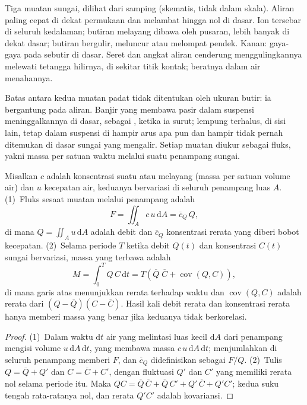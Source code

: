 \begin{omfigure}
{\small Tiga muatan sungai, dilihat dari samping (skematis, tidak dalam skala). Aliran paling cepat di dekat permukaan dan melambat hingga nol di dasar. Ion tersebar di seluruh kedalaman; butiran melayang dibawa oleh pusaran, lebih banyak di dekat dasar; butiran  bergulir, meluncur atau melompat pendek. Kanan: gaya-gaya pada sebutir di dasar. Seret dan angkat aliran cenderung menggulingkannya melewati tetangga hilirnya, di sekitar titik kontak; beratnya dalam air menahannya.}
\label{fig:b1:erosion-transport:loads}
\end{omfigure}

Batas antara kedua muatan padat tidak ditentukan oleh ukuran butir: ia bergantung pada aliran. Banjir yang membawa pasir dalam suspensi meninggalkannya di dasar, sebagai , ketika ia surut; lempung terhalus, di sisi lain, tetap dalam suspensi di hampir arus apa pun dan hampir tidak pernah ditemukan di dasar sungai yang mengalir. Setiap muatan diukur sebagai fluks, yakni massa per satuan waktu melalui suatu penampang sungai.

\begin{proposition}\label{prop:b1:erosion-transport:flux}
Misalkan $c$ adalah konsentrasi suatu  atau melayang (massa per satuan volume air) dan $u$ kecepatan air, keduanya bervariasi di seluruh penampang luas $A$. (1)~Fluks sesaat muatan melalui penampang adalah
\[
  F = \iint_A c\,u\,\mathrm dA = \overline{c}_Q\,Q,
\]
di mana $Q = \iint_A u\,\mathrm dA$ adalah debit dan $\overline{c}_Q$ konsentrasi rerata yang diberi bobot kecepatan. (2)~Selama periode $T$ ketika debit $Q(t)$ dan konsentrasi $C(t)$ sungai bervariasi, massa yang terbawa adalah
\[
  M = \int_0^T Q\,C\,\mathrm dt = T\left(\overline{Q}\;\overline{C} +
  \operatorname{cov}(Q, C)\right),
\]
di mana garis atas menunjukkan rerata terhadap waktu dan $\operatorname{cov}(Q, C)$ adalah rerata dari $(Q - \overline{Q})(C - \overline{C})$. Hasil kali debit rerata dan konsentrasi rerata hanya memberi massa yang benar jika keduanya tidak berkorelasi.
\end{proposition}

\begin{proof}
(1)~Dalam waktu $\mathrm dt$ air yang melintasi luas kecil $\mathrm dA$ dari penampang
mengisi volume $u\,\mathrm dA\,\mathrm dt$, yang membawa massa
$c\,u\,\mathrm dA\,\mathrm dt$; menjumlahkan di seluruh penampang memberi $F$, dan
$\overline{c}_Q$ didefinisikan sebagai $F/Q$. (2)~Tulis $Q = \overline{Q} + Q'$ dan $C =
\overline{C} + C'$, dengan fluktuasi $Q'$ dan $C'$ yang memiliki rerata nol selama
periode itu. Maka $QC = \overline{Q}\,\overline{C} + \overline{Q}\,C' + Q'\,\overline{C}
+ Q'C'$; kedua suku tengah rata-ratanya nol, dan rerata $Q'C'$ adalah
kovariansi.
\end{proof}

